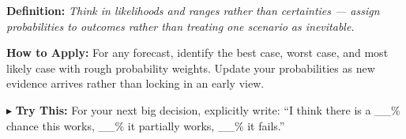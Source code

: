 \begin{tcolorbox}[title={\small \textbf{13 | Probabilistic Thinking}},
  colback=blue!5!white, colframe=blue!40!black,
  fonttitle=\bfseries\small, boxrule=0.5pt]
\textbf{Definition:} \textit{Think in likelihoods and ranges rather than certainties --- assign probabilities to outcomes rather than treating one scenario as inevitable.}

\medskip
\textbf{How to Apply:} For any forecast, identify the best case, worst case, and most likely case with rough probability weights. Update your probabilities as new evidence arrives rather than locking in an early view.

\medskip
$\blacktriangleright$ \textbf{Try This:} For your next big decision, explicitly write: ``I think there is a \_\_\% chance this works, \_\_\% it partially works, \_\_\% it fails.''
\end{tcolorbox}


